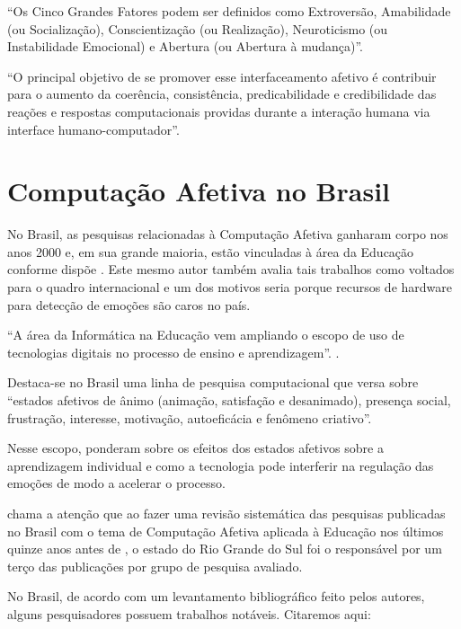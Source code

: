 \documentclass[
	12pt,				    %
	openright,			    %
	oneside,			    %
	a4paper,			    %
    sumario=tradicional,    %
	english,			    %
	brazil,				    %
	]{abntex2}              %
\begin{document}
 ``Os Cinco Grandes Fatores podem ser definidos como Extroversão, Amabilidade (ou Socialização), Conscientização (ou Realização), Neuroticismo (ou Instabilidade Emocional) e Abertura (ou Abertura à mudança)''.  
 
 ``O principal objetivo de se promover esse interfaceamento afetivo é contribuir para o aumento da coerência, consistência, predicabilidade e credibilidade das reações e respostas computacionais providas durante a interação humana via interface humano-computador''. \cite{nunes2010computaccao}

\section{Computação Afetiva no Brasil}

No Brasil, as pesquisas relacionadas à Computação Afetiva ganharam corpo nos anos 2000 e, em sua grande maioria, estão vinculadas à área da Educação conforme dispõe . Este mesmo autor também avalia tais trabalhos como voltados para o quadro internacional e um dos motivos seria porque  recursos de hardware para detecção de emoções são caros no país.

``A área da Informática na Educação vem ampliando o escopo de uso de tecnologias digitais no processo de ensino e aprendizagem''. \cite{Rodrigues2017}.

Destaca-se no Brasil uma linha de pesquisa computacional que versa sobre ``estados afetivos de ânimo (animação, satisfação e desanimado), presença social, frustração, interesse, motivação, autoeficácia e fenômeno criativo''.\cite{Bercht2017}

Nesse escopo,  ponderam sobre os efeitos dos estados afetivos sobre a aprendizagem individual e como a tecnologia pode interferir na regulação das emoções de modo a acelerar o processo.

 chama a atenção que ao fazer uma revisão sistemática das pesquisas publicadas no Brasil com o tema de Computação Afetiva aplicada à Educação nos últimos quinze anos antes de \citeyear{morais2017}, o estado do Rio Grande do Sul foi o responsável por um terço das publicações por grupo de pesquisa avaliado.

No Brasil, de acordo com um levantamento bibliográfico feito pelos autores, alguns pesquisadores possuem trabalhos notáveis. Citaremos aqui:
\end{document}
